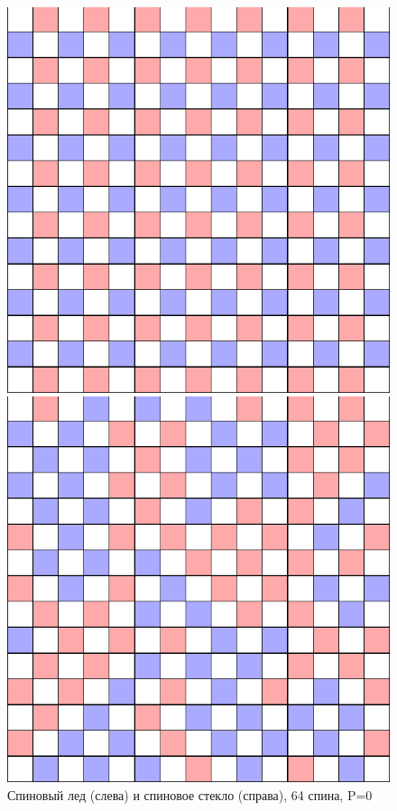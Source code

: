 \documentclass[utf8, babel, sor, jor, amsmath, amssymb, reprint]{elsarticle} %
\begin{document}
\begin{figure}[H]
	\begin{minipage}[h]{0.45\linewidth}
		\includegraphics[width=1\linewidth]{cell_SI_64_J0_1.png}
	\end{minipage}
	\hfill
	\begin{minipage}[h]{0.45\linewidth}
		\includegraphics[width=1\linewidth]{cell_SG_64_J0_6.png}
	\end{minipage}
	\caption{Спиновый лед (слева) и спиновое стекло (справа), 64 спина, P=0}
	\label{fig:cell_SI_SG}
\end{figure}
\end{document}
